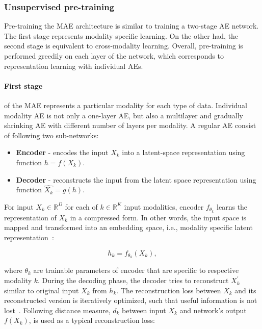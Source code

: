 \subsubsection{Unsupervised pre-training} 
Pre-training the MAE architecture is similar to training a two-stage AE network. The first stage represents modality specific learning. On the other had, the second stage is equivalent to cross-modality learning. 
Overall, pre-training is performed greedily on each layer of the network, which corresponds to representation learning with individual AEs. 

\paragraph{First stage}\noindent of the MAE represents a particular modality for each type of data. Individual modality AE is not only a one-layer AE, but also a multilayer and gradually shrinking AE with different number of layers per modality. A regular AE consist of following two sub-networks: 

\begin{itemize}[noitemsep]
    \item \textbf{Encoder} - encodes the input $X_{k}$ into a latent-space representation using function $h = f(X_{k})$.
    \item \textbf{Decoder} - reconstructs the input from the latent space representation using function $\hat{X_k} = g(h)$. 
\end{itemize}

\hspace*{3.5mm} For input $X_{k} \in \mathbb{R}^{D}$ for each of $k \in \mathbb{R}^K$ input modalities, encoder $f_{\theta_{k}}$ learns the representation of $X_{k}$ in a compressed form. In other words, the input space is mapped and transformed into an embedding space, i.e., modality specific latent representation~\cite{mmdcae}: 

\begin{equation}
    h_{k}=f_{\theta_{k}}\left({X}_{k}\right),
\end{equation}

\hspace*{3.5mm} where $\theta_{k}$ are trainable parameters of encoder that are specific to respective modality $k$. During the decoding phase, the decoder tries to reconstruct ${X}_{k}^{\prime}$ similar to original input ${X}_{k}$ from $h_{k}$. The reconstruction loss between $X_{k}$ and its reconstructed version is iteratively optimized, such that useful information is not lost~\cite{KarimIEEEAccess2019}. Following distance measure, $d_{k}$ between input $X_{k}$ and network's output $f(X_{k})$, is used as a typical reconstruction loss: 

